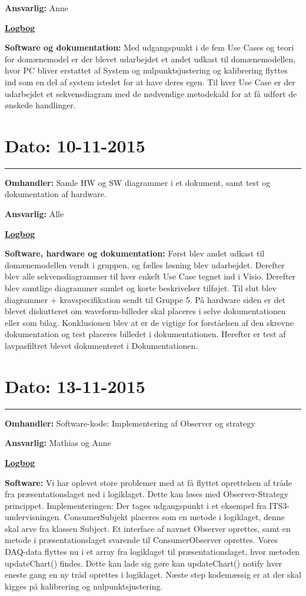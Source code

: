 \textbf{Ansvarlig:} Anne

\underline{\textbf{Logbog}}

\textbf{Software og dokumentation: }Med udgangspunkt i de fem Use Cases og teori for domænemodel er der blevet udarbejdet et andet udkast til domænemodellen, hvor PC bliver erstattet af System og nulpunktsjustering og kalibrering flyttes ind som en del af system istedet for at have deres egen.
Til hver Use Case er der udarbejdet et sekvensdiagram med de nødvendige metodekald for at få udført de ønskede handlinger.
\\

\section{Dato: 10-11-2015}
\hrule
\textbf{Omhandler:} Samle HW og SW diagrammer i et dokument, samt test og dokumentation af hardware.

\textbf{Ansvarlig:} Alle

\underline{\textbf{Logbog}}

\textbf{Software, hardware og dokumentation: }Først blev andet udkast til domænemodellen vendt i gruppen, og fælles løsning blev udarbejdet. Derefter blev alle sekvensdiagrammer til hver enkelt Use Case tegnet ind i Visio. Derefter blev samtlige diagrammer samlet og korte beskrivelser tilføjet. Til slut blev diagrammer + kravspecifikation sendt til Gruppe 5. 
På hardware siden er det blevet diskutteret om waveform-billeder skal placeres i selve dokumentationen eller som bilag. Konklusionen blev at er de vigtige for forståelsen af den skrevne dokumentation og test placeres billedet i dokumentationen. Herefter er test af lavpasfiltret blevet dokumenteret i Dokumentationen.
\\

\section{Dato: 13-11-2015}
\hrule
\textbf{Omhandler:} Software-kode: Implementering af Observer og strategy

\textbf{Ansvarlig:} Mathias og Anne

\underline{\textbf{Logbog}}

\textbf{Software: }Vi har oplevet store problemer med at få flyttet oprettelsen af tråde fra præsentationslaget ned i logiklaget. Dette kan løses med Observer-Strategy princippet. 
Implementeringen: Der tages udgangspunkt i et eksempel fra ITS3-undervisningen. ConsumerSubjekt placeres som en metode i logiklaget, denne skal arve fra klassen Subject. Et interface af navnet Observer oprettes, samt en metode i præsentationslaget svarende til ConsumerObserver oprettes. Vores DAQ-data flyttes nu i et array fra logiklaget til præsentationslaget, hvor metoden updateChart() findes. Dette kan lade sig gøre kan updateChart() notify hver eneste gang en ny tråd oprettes i logiklaget. 
Næste step kodemæssig er at der skal kigges på kalibrering og nulpunktsjustering.
\\

